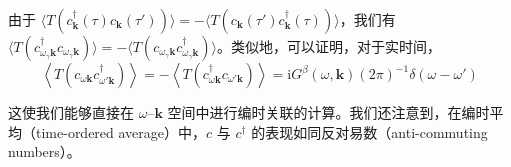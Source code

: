 
由于 $\langle T(c_{\pmb{k}}^{\dagger}(\tau)c_{\pmb{k}}(\tau'))\rangle = -\langle T(c_{\pmb{k}}(\tau')c_{\pmb{k}}^{\dagger}(\tau))\rangle$，我们有 $\langle T(c_{\omega_{\gamma}\pmb{k}}^{\dagger}c_{\omega_{\gamma}\pmb{k}})\rangle = -\langle T(c_{\omega_{\gamma}\pmb{k}}c_{\omega_{\gamma}\pmb{k}}^{\dagger})\rangle$。类似地，可以证明，对于实时间，
\begin{equation*}
\left\langle T(c_{\omega\pmb{k}}c_{\omega'\pmb{k}}^{\dagger})\right\rangle
= -\left\langle T(c_{\omega\pmb{k}}^{\dagger}c_{\omega'\pmb{k}})\right\rangle
= \mathrm{i}G^{\beta}(\omega,\pmb{k})(2\pi)^{-1}\delta(\omega-\omega')
\end{equation*}

这使我们能够直接在 $\omega$--$\pmb{k}$ 空间中进行编时关联的计算。我们还注意到，在编时平均（time-ordered average）中，$c$ 与 $c^{\dagger}$ 的表现如同反对易数（anti-commuting numbers）。

